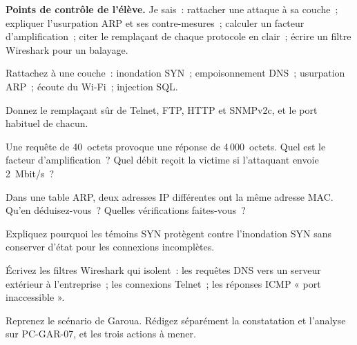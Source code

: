 \begin{boxinfo}
\textbf{Points de contrôle de l'élève.} Je sais~: rattacher une attaque à
sa couche~; expliquer l'usurpation ARP et ses contre-mesures~; calculer un
facteur d'amplification~; citer le remplaçant de chaque protocole en
clair~; écrire un filtre Wireshark pour un balayage.
\end{boxinfo}

\bigskip

\begin{boxexo}[title={\ding{45}\quad Exercice~15.1. Quelle couche~? \niveaubase}]
Rattachez à une couche~: inondation SYN~; empoisonnement DNS~; usurpation
ARP~; écoute du Wi-Fi~; injection SQL.
\end{boxexo}

\begin{boxexo}[title={\ding{45}\quad Exercice~15.2. Remplacer \niveaubase}]
Donnez le remplaçant sûr de Telnet, FTP, HTTP et SNMPv2c, et le port
habituel de chacun.
\end{boxexo}

\begin{boxexo}[title={\ding{45}\quad Exercice~15.3. Amplification \niveaubase}]
Une requête de 40~octets provoque une réponse de 4\,000~octets. Quel est
le facteur d'amplification~? Quel débit reçoit la victime si l'attaquant
envoie 2~Mbit/s~?
\end{boxexo}

\begin{boxexo}[title={\ding{45}\quad Exercice~15.4. ARP \niveaumoyen}]
Dans une table ARP, deux adresses IP différentes ont la même adresse MAC.
Qu'en déduisez-vous~? Quelles vérifications faites-vous~?
\end{boxexo}

\begin{boxexo}[title={\ding{45}\quad Exercice~15.5. SYN cookies \niveaumoyen}]
Expliquez pourquoi les témoins SYN protègent contre l'inondation SYN sans
conserver d'état pour les connexions incomplètes.
\end{boxexo}

\begin{boxexo}[title={\ding{45}\quad Exercice~15.6. Filtres \niveaumoyen}]
Écrivez les filtres Wireshark qui isolent~: les requêtes DNS vers un
serveur extérieur à l'entreprise~; les connexions Telnet~; les réponses
ICMP « port inaccessible ».
\end{boxexo}

\begin{boxexo}[title={\ding{45}\quad Exercice~15.7. Le balayage \niveaumoyen}]
Reprenez le scénario de Garoua. Rédigez séparément la constatation et
l'analyse sur PC-GAR-07, et les trois actions à mener.
\end{boxexo}

